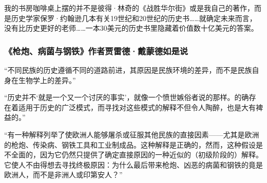 我的书房咖啡桌上摆的并不是彼得·林奇的《战胜华尔街》或是我自己的著作，而是历史学家保罗·约翰逊几本有关19世纪和20世纪的历史书……就确定未来而言，没有比历史更好的老师……一本30美元的历史书里隐藏着价值数十亿美元的答案。
\par

\subsubsection*{《枪炮、病菌与钢铁》作者贾雷德·戴蒙德如是说}

“不同民族的历史遵循不同的道路前进，其原因是民族环境的差异，而不是民族自身在生物学上的差异。”
\par

“历史并不‘就是一个又一个讨厌的事实’，就像一个愤世嫉俗者说的那样。的确存在着适用于历史的广泛模式，而寻找对这些模式的解释不但令人陶醉，也是大有裨益的。”
\par

“有一种解释列举了使欧洲人能够屠杀或征服其他民族的直接因素——尤其是欧洲的枪炮、传染病、钢铁工具和工业制成品。这种解释是正确的，然而，这种假设是不全面的，因为它仍然只提供了确定直接原因的一种近似的（初级阶段的）解释。它使人不由得想去寻找终极原因：为什么最后带来枪炮、凶恶的病菌和钢铁的竟是欧洲人，而不是非洲人或印第安人？”
\par
